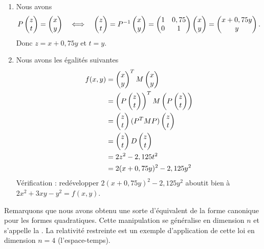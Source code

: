 {\begin{enumerate}
		\item
		Nous avons
		\begin{align*}
			P\begin{pmatrix} z \\ t \end{pmatrix} = \begin{pmatrix} x \\ y \end{pmatrix} && \iff && \begin{pmatrix} z \\ t \end{pmatrix} = P^{-1} \begin{pmatrix} x \\ y \end{pmatrix} =  \begin{pmatrix} 1&0,75\\0&1\end{pmatrix} \begin{pmatrix} x \\ y \end{pmatrix} = \begin{pmatrix} x+0,75y \\ y \end{pmatrix}.
		\end{align*}
		Donc $z=x+0,75y$ et $t = y$.
		\item
		Nous avons les égalités suivantes
		\begin{align*}
			f(x,y) &= \begin{pmatrix} x \\ y \end{pmatrix}^T M \begin{pmatrix} x \\ y \end{pmatrix} \\
				&= \left( P\begin{pmatrix} z \\ t \end{pmatrix} \right)^T M \left(P\begin{pmatrix} z \\ t \end{pmatrix}\right) \\
				&= \begin{pmatrix} z \\ t \end{pmatrix} (P^T M P) \begin{pmatrix} z \\ t \end{pmatrix} \\
				&= \begin{pmatrix} z \\ t \end{pmatrix} D \begin{pmatrix} z \\ t \end{pmatrix} \\
				&= 2z^2 - 2,125t^2 \\
				&= 2(x+0,75y)^2 - 2,125y^2
		\end{align*}
		Vérification : redévelopper $2(x+0,75y)^2 - 2,125y^2$ aboutit bien à $2x^2 + 3xy - y^2 = f(x,y)$.
	\end{enumerate}
	Remarquons que nous avons obtenu une sorte d'équivalent de la forme canonique pour les formes quadratiques.
	Cette manipulation se généralise en dimension $n$ et s'appelle la .
	La relativité restreinte est un exemple d'application de cette loi en dimension $n=4$ (l'espace-temps).
}





